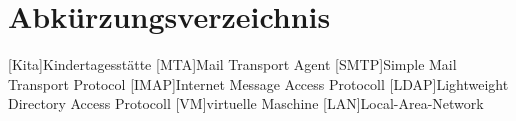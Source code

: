 
\chapter*{Abkürzungsverzeichnis}
\markboth{}{}

\begin{acronym}[EuGH]
[Kita]{Kindertagesstätte}
[MTA]{Mail Transport Agent}
[SMTP]{Simple Mail Transport Protocol}
[IMAP]{Internet Message Access Protocoll}
[LDAP]{Lightweight Directory Access Protocoll}
[VM]{virtuelle Maschine}
[LAN]{Local-Area-Network}

\end{acronym}